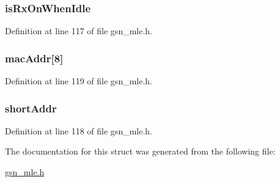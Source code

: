 \hypertarget{a00150_a8ddbcf3bf06d5167eb53d0c005908021}{
\subsubsection[{isRxOnWhenIdle}]{ {\bf isRxOnWhenIdle}}}
\label{a00150_a8ddbcf3bf06d5167eb53d0c005908021}


Definition at line 117 of file gsn\_\-mle.h.

\hypertarget{a00150_a50588254dfbe5049265b792e1cab13c2}{
\subsubsection[{macAddr}]{ {\bf macAddr}\mbox{[}8\mbox{]}}}
\label{a00150_a50588254dfbe5049265b792e1cab13c2}


Definition at line 119 of file gsn\_\-mle.h.

\hypertarget{a00150_a9b19e8e3387061f7498579b37cdbabdf}{
\subsubsection[{shortAddr}]{ {\bf shortAddr}}}
\label{a00150_a9b19e8e3387061f7498579b37cdbabdf}


Definition at line 118 of file gsn\_\-mle.h.



The documentation for this struct was generated from the following file:\begin{DoxyCompactItemize}
\item 
\hyperlink{a00527}{gsn\_\-mle.h}\end{DoxyCompactItemize}
